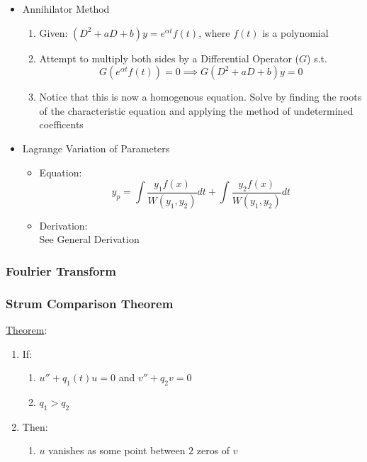 \documentclass[11pt]{article}
\begin{document}
\begin{itemize}
\item Annihilator Method
\label{sec-9-2-5-5}%
\begin{enumerate}
\item Given: $(D^2+aD+b)y=e^{\alpha t}f(t)$, where $f(t)$ is a polynomial
\item Attempt to multiply both sides by a Differential Operator ($G$) s.t.
        \begin{equation}
        G(e^{\alpha t}f(t)) = 0 \implies G(D^2+aD+b)y=0
        \end{equation}
\item Notice that this is now a homogenous equation. Solve by
        finding the roots of the characteristic equation and applying
        the method of undetermined coefficents
\end{enumerate}

\item Lagrange Variation of Parameters
\label{sec-9-2-5-6}%
\begin{itemize}

\item Equation:\\
\label{sec-9-2-5-6-1}%
\begin{equation}
      y_p=\int{\frac{y_1f(x)}{W(y_1,y_2)}dt}+\int{\frac{y_2f(x)}{W(y_1,y_2)}dt}
      \end{equation}

\item Derivation:\\
\label{sec-9-2-5-6-2}%
See General Derivation
\end{itemize} %
\end{itemize} %
\subsubsection{Foulrier Transform}
\label{sec-9-2-6}
\subsubsection{Strum Comparison Theorem}
\label{sec-9-2-7}

    \underline{Theorem}:
\begin{enumerate}
\item If:
\begin{enumerate}
\item $u''+q_1(t)u=0$ and $v''+q_2v =0$
\item $q_1>q_2$
\end{enumerate}
\item Then:
\begin{enumerate}
\item $u$ vanishes as some point between $2$ zeros of $v$
\end{enumerate}
\end{enumerate}
\end{document}
